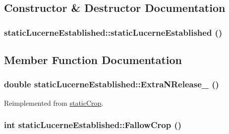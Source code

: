 \subsection{Constructor \& Destructor Documentation}
\hypertarget{classstatic_lucerne_established_a60fcea211f812a48031c68eb419b27c0}{
\subsubsection[{staticLucerneEstablished}]{\setlength{\rightskip}{0pt plus 5cm}staticLucerneEstablished::staticLucerneEstablished ()}}
\label{classstatic_lucerne_established_a60fcea211f812a48031c68eb419b27c0}


\subsection{Member Function Documentation}
\hypertarget{classstatic_lucerne_established_adfaea4391ee1981284ea351c5dbd0b6d}{
\subsubsection[{ExtraNRelease\_\-}]{\setlength{\rightskip}{0pt plus 5cm}double staticLucerneEstablished::ExtraNRelease\_\- ()}}
\label{classstatic_lucerne_established_adfaea4391ee1981284ea351c5dbd0b6d}


Reimplemented from \hyperlink{classstatic_crop_afe0cb8a7831afa941a37338f05227d67}{staticCrop}.\hypertarget{classstatic_lucerne_established_a011b54874a78edb25be05c3ab4d4d641}{
\subsubsection[{FallowCrop}]{\setlength{\rightskip}{0pt plus 5cm}int staticLucerneEstablished::FallowCrop ()}}
\label{classstatic_lucerne_established_a011b54874a78edb25be05c3ab4d4d641}


